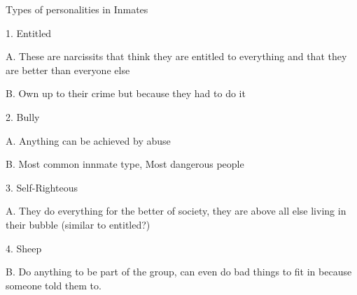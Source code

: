 Types of personalities in Inmates

	1.  Entitled
		
		A. These are narcissits that think they are entitled to everything and that they are better than everyone else
		
		B. Own up to their crime but because they had to do it
		
	2. Bully
		
		A.   Anything can be achieved by abuse
		
		B.  Most common innmate type, Most dangerous people
		
	
	3. Self-Righteous 
	
		A.  They do everything for the better of society, they are above all else living in their bubble (similar to entitled?)
		
		
	
	4. Sheep
	
		B. Do anything to be part of the group, can even do bad things to fit in because someone told them to.